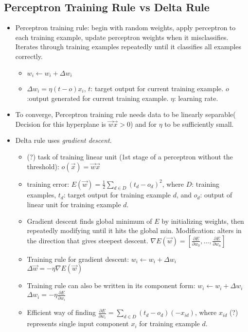\documentclass[11pt]{article}
\begin{document}
\subsection{Perceptron Training Rule vs Delta Rule}
\begin{itemize}
\item Perceptron training rule: begin with random weights, apply perceptron to each training example, update perceptron weights when it misclassifies. Iterates through training examples repeatedly until it classifies all examples correctly.
\begin{itemize}
\item $w_i \leftarrow w_i + \Delta w_i$
\item $\Delta w_i=\eta (t-o) x_i$, $t$: target output for current training example. $o$:output generated for current training example. $\eta$: learning rate.
\end{itemize}
\item To converge, Perceptron training rule needs data to be linearly separable( Decision for this hyperplane is $\vec{w}\vec{x} >0$) and for $\eta$ to be sufficiently small.
\item Delta rule uses \textit{gradient descent}.
\begin{itemize}
\item (?) task of training linear unit (1st stage of a perceptron without the threshold): $o(\vec{x}) = \vec{w}\vec{x}$
\item training error: $E(\vec{w})=\frac{1}{2} \sum_{d \in D} (t_d - o_d)^2$, where $D$: training examples, $t_d$: target output for training example $d$, and $o_d$: output of linear unit for training example $d$.
\item Gradient descent finds global minimum of $E$ by initializing weights, then repeatedly modifying until it hits the global min. Modification: alters in the direction that gives steepest descent. $\nabla E(\vec{w})= [\frac{\partial E}{\partial w_0},...,\frac{\partial E}{\partial w_n}]$
\item Training rule for gradient descent: $w_i \leftarrow w_i + \Delta w_i$\\
$\Delta \vec{w} = -\eta \nabla E(\vec{w})$
\item Training rule can also be written in its component form: $w_i \leftarrow w_i+\Delta w_i$\\ $\Delta w_i = -\eta \frac{\partial E}{\partial w_i}$
\item Efficient way of finding $\frac{\partial E}{\partial w_i} = \sum_{d \in D} (t_d-o_d)(-x_{id})$, where $x_{id}$ (?) represents single input component $x_i$ for training example $d$.

\end{itemize}
\end{itemize}
\end{document}
